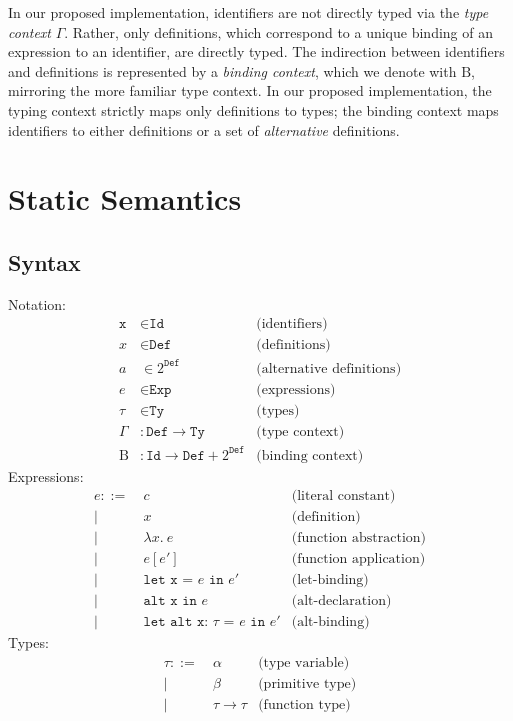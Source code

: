 \documentclass{article}
\renewcommand{\=}{\triangleq}
\begin{document}
In our proposed implementation, identifiers are not directly typed
via the \emph{type context} $\Gamma$.
Rather, only definitions, which correspond to a unique binding of an expression
to an identifier, are directly typed.
The indirection between identifiers and definitions is represented by a
\emph{binding context}, which we denote with $\text{B}$,
mirroring the more familiar type context.
In our proposed implementation, the typing context strictly maps only
definitions to types;
the binding context maps identifiers to either definitions or
a set of \emph{alternative} definitions.

\section{Static Semantics}

\subsection{Syntax}

Notation:
\begin{align*}
  \texttt{x} &\in \texttt{Id} & \text{(identifiers)} \\
  x &\in \texttt{Def} & \text{(definitions)} \\
  a &\in 2^{\texttt{Def}} & \text{(alternative definitions)} \\
  e &\in \texttt{Exp} & \text{(expressions)} \\
  \tau &\in \texttt{Ty} & \text{(types)} \\
  \Gamma &: \texttt{Def} \to \texttt{Ty} & \text{(type context)} \\
  \text{B} &: \texttt{Id} \to \texttt{Def} + 2^{\texttt{Def}} & \text{(binding context)}
\end{align*}
Expressions:
\begin{align*}
  e ::=
   ~& c & \text{(literal constant)} \\
  |~& x & \text{(definition)} \\
  |~& \lambda x .~e & \text{(function abstraction)} \\
  |~& e[e'] & \text{(function application)} \\
  |~& \texttt{let x = $e$ in $e'$} & \text{(let-binding)} \\
  |~& \texttt{alt x in $e$} & \text{(alt-declaration)} \\
  |~& \texttt{let alt x: $\tau$ = $e$ in $e'$} & \text{(alt-binding)}
\end{align*}
Types:
\begin{align*}
  \tau ::=
   ~& \alpha & \text{(type variable)} \\
  |~& \beta & \text{(primitive type)} \\
  |~& \tau \to \tau & \text{(function type)}
\end{align*}
\end{document}

